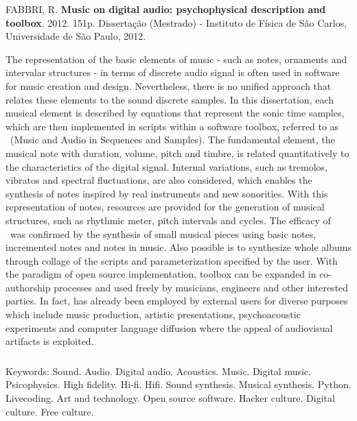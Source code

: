 \afterpage{\blankpage}

\begin{abstract2}
\vspace{-10mm}
FABBRI, R. \textbf{Music on digital audio: psychophysical description and toolbox}. 2012. 151p. Dissertação (Mestrado) - Instituto de Física de São Carlos, Universidade de São Paulo, 2012.
\vspace{15mm}

The representation of the basic elements of music - such as notes, ornaments and intervalar structures - in terms of discrete audio signal is often used in software for music creation and design. Nevertheless, there is no unified approach that relates these elements to the sound discrete samples. In this dissertation, each musical element is described by equations that represent the sonic time samples, which are then implemented in scripts within a software toolbox, referred to as \massa\ (Music and Audio in Sequences and Samples). The fundamental element, the musical note with duration, volume, pitch and timbre, is related quantitatively to the characteristics of the digital signal. Internal variations, such as tremolos, vibratos and spectral fluctuations, are also considered, which enables the synthesis of notes inspired by real instruments and new sonorities. With this representation of notes, resources are provided for the generation of musical structures, such as rhythmic meter, pitch intervals and cycles. The efficacy of \massa\ was confirmed by the synthesis of small musical pieces using basic notes, incremented notes and notes in music. Also possible is to synthesize whole albums through collage of the scripts and parameterization specified by the user. With the paradigm of open source implementation, \massa toolbox can be expanded in co-authorship processes and used freely by musicians, engineers and other interested parties. In fact, \massa has already been employed by external users for diverse purposes which include music production, artistic presentations, psychoacoustic experiments and computer language diffusion where the appeal of audiovisual artifacts is exploited.


$\phantom{linha em branco}$\\
Keywords: Sound. Audio. Digital audio. Acoustics. Music. Digital music. Psicophysics. High fidelity. Hi-fi. Hifi. Sound synthesis. Musical synthesis. Python. Livecoding. Art and technology. Open source software. Hacker culture. Digital culture. Free culture.


\end{abstract2}
